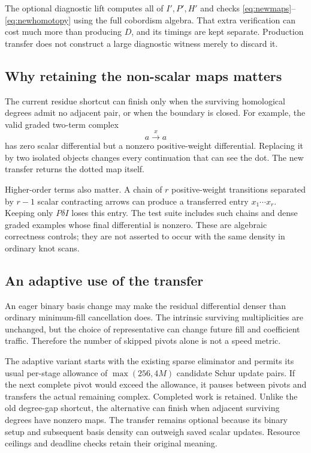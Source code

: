 \documentclass[11pt]{article}
\theoremstyle{definition}
\theoremstyle{remark}
\begin{document}
The optional diagnostic lift computes all of $I',P',H'$ and checks \eqref{eq:newmaps}--\eqref{eq:newhomotopy} using the full cobordism algebra. That extra verification can cost much more than producing $D$, and its timings are kept separate. Production transfer does not construct a large diagnostic witness merely to discard it.

\subsection{Why retaining the non-scalar maps matters}
The current residue shortcut can finish only when the surviving homological degrees admit no adjacent pair, or when the boundary is closed. For example, the valid graded two-term complex
\[
 a\xrightarrow{x}a
\]
has zero scalar differential but a nonzero positive-weight differential. Replacing it by two isolated objects changes every continuation that can see the dot. The new transfer returns the dotted map itself.

Higher-order terms also matter. A chain of $r$ positive-weight transitions separated by $r-1$ scalar contracting arrows can produce a transferred entry $x_1\cdots x_r$. Keeping only $P\delta I$ loses this entry. The test suite includes such chains and dense graded examples whose final differential is nonzero. These are algebraic correctness controls; they are not asserted to occur with the same density in ordinary knot scans.

\subsection{An adaptive use of the transfer}
An eager binary basis change may make the residual differential denser than ordinary minimum-fill cancellation does. The intrinsic surviving multiplicities are unchanged, but the choice of representative can change future fill and coefficient traffic. Therefore the number of skipped pivots alone is not a speed metric.

The adaptive variant starts with the existing sparse eliminator and permits its usual per-stage allowance of $\max(256,4M)$ candidate Schur update pairs. If the next complete pivot would exceed the allowance, it pauses between pivots and transfers the actual remaining complex. Completed work is retained. Unlike the old degree-gap shortcut, the alternative can finish when adjacent surviving degrees have nonzero maps. The transfer remains optional because its binary setup and subsequent basis density can outweigh saved scalar updates. Resource ceilings and deadline checks retain their original meaning.
\end{document}
